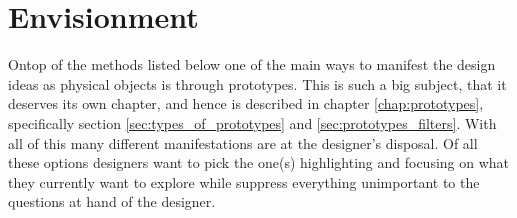 \section{Envisionment} \label{sec:envisionment}
Ontop of the methods listed below one of the main ways to manifest the design ideas as physical objects is through prototypes. This is such a big subject, that it deserves its own chapter, and hence is described in chapter \ref{chap:prototypes}, specifically section \ref{sec:types_of_prototypes} and \ref{sec:prototypes_filters}. With all of this many different manifestations are at the designer's disposal. Of all these options designers want to pick the one(s) highlighting and focusing on what they currently want to explore while suppress everything unimportant to the questions at hand of the designer. \cite[p. 167]{benyon14}






